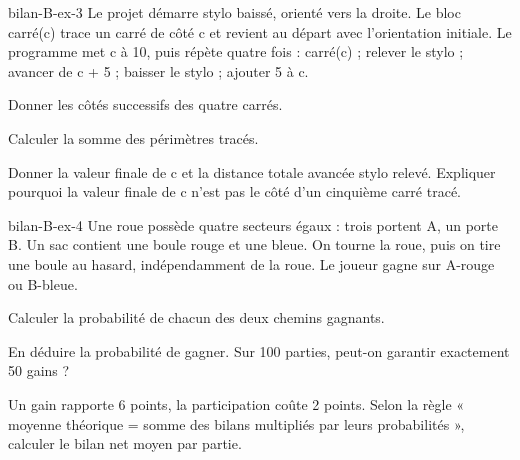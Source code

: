 \begin{blocEdition}{bilan-B-ex-3}
Le projet démarre stylo baissé, orienté vers la droite. Le bloc carré(c) trace un carré de côté c et revient au départ avec l’orientation initiale. Le programme met c à 10, puis répète quatre fois : carré(c) ; relever le stylo ; avancer de c + 5 ; baisser le stylo ; ajouter 5 à c.\begin{questions}
\item Donner les côtés successifs des quatre carrés.
\item Calculer la somme des périmètres tracés.
\item Donner la valeur finale de c et la distance totale avancée stylo relevé. Expliquer pourquoi la valeur finale de c n’est pas le côté d’un cinquième carré tracé.
\end{questions}\par{}\label{fig-bilan-B-ex-3}

\end{blocEdition}
\begin{blocEdition}{bilan-B-ex-4}
Une roue possède quatre secteurs égaux : trois portent A, un porte B. Un sac contient une boule rouge et une bleue. On tourne la roue, puis on tire une boule au hasard, indépendamment de la roue. Le joueur gagne sur A-rouge ou B-bleue.\begin{questions}
\item Calculer la probabilité de chacun des deux chemins gagnants.
\item En déduire la probabilité de gagner. Sur 100 parties, peut-on garantir exactement 50 gains ?
\item Un gain rapporte 6 points, la participation coûte 2 points. Selon la règle « moyenne théorique = somme des bilans multipliés par leurs probabilités », calculer le bilan net moyen par partie.
\end{questions}\par{}\label{fig-bilan-B-ex-4}

\end{blocEdition}
